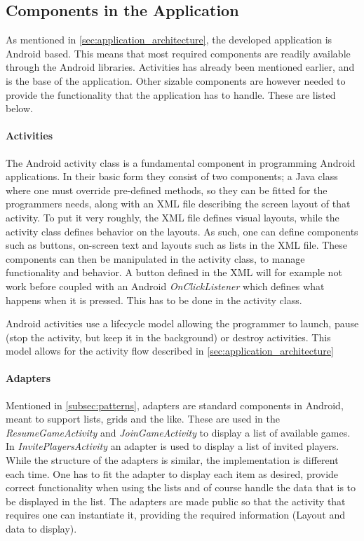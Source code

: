 \subsection{Components in the Application} \label{subsec:components}
As mentioned in \ref{sec:application_architecture}, the developed application is Android based. This means that most required components are readily available through the Android libraries. Activities has already been mentioned earlier, and is the base of the application. Other sizable components are however needed to provide the functionality that the application has to handle. These are listed below.

\paragraph{Activities}
The Android activity class is a fundamental component in programming Android applications\cite{android-activity}. In their basic form they consist of two components; a Java class where one must override pre-defined methods, so they can be fitted for the programmers needs, along with an XML file describing the screen layout of that activity. To put it very roughly, the XML file defines visual layouts, while the activity class defines behavior on the layouts. As such, one can define components such as buttons, on-screen text and layouts such as lists in the XML file. These components can then be manipulated in the activity class, to manage functionality and behavior. A button defined in the XML will for example not work before coupled with an Android \textit{OnClickListener} which defines what happens when it is pressed. This has to be done in the activity class.

Android activities use a lifecycle model allowing the programmer to launch, pause (stop the activity, but keep it in the background) or destroy activities. This model allows for the activity flow described in \ref{sec:application_architecture}

\paragraph{Adapters}
Mentioned in \ref{subsec:patterns}, adapters are standard components in Android, meant to support lists, grids and the like. These are used in the \textit{ResumeGameActivity} and \textit{JoinGameActivity} to display a list of available games. In \textit{InvitePlayersActivity} an adapter is used to display a list of invited players. While the structure of the adapters is similar, the implementation is different each time. One has to fit the adapter to display each item as desired, provide correct functionality when using the lists and of course handle the data that is to be displayed in the list. The adapters are made public so that the activity that requires one can instantiate it, providing the required information (Layout and data to display).

